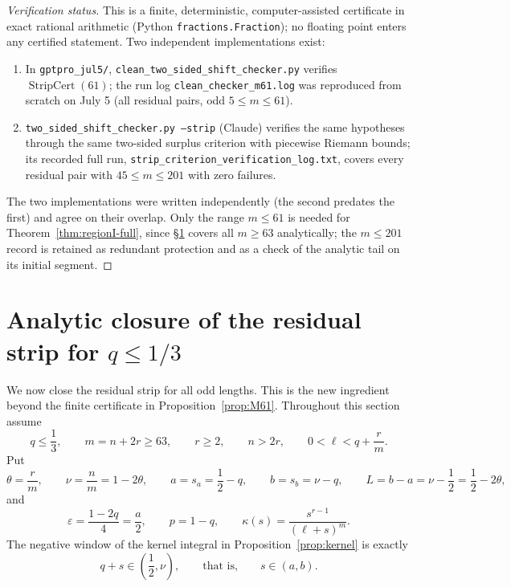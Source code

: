 \documentclass[11pt]{article}
\begin{document}
\begin{proof}[Verification status]
This is a finite, deterministic, computer-assisted certificate in exact
rational arithmetic (Python \texttt{fractions.Fraction}); no floating point
enters any certified statement.  Two independent implementations exist:
\begin{enumerate}[label=\textup{(\alph*)}]
\item In \texttt{gptpro\_jul5/}, \texttt{clean\_two\_sided\_shift\_checker.py} verifies
$\operatorname{StripCert}(61)$; the run log
\texttt{clean\_checker\_m61.log} was reproduced from scratch on July 5
(all residual pairs, odd $5\le m\le61$).
\item \texttt{two\_sided\_shift\_checker.py --strip} (Claude) verifies the
same hypotheses through the same two-sided surplus criterion with piecewise
Riemann bounds; its recorded full run,
\texttt{strip\_criterion\_verification\_log.txt}, covers every residual pair
with $45\le m\le201$ with zero failures.
\end{enumerate}
The two implementations were written independently (the second predates the
first) and agree on their overlap.  Only the range $m\le61$ is needed for
Theorem~\ref{thm:regionI-full}, since \S\ref{sec:analytic-strip} covers all
$m\ge63$ analytically; the $m\le201$ record is retained as redundant
protection and as a check of the analytic tail on its initial segment.
\end{proof}



\section{Analytic closure of the residual strip for $q\le 1/3$}\label{sec:analytic-strip}

We now close the residual strip for all odd lengths.  This is the new ingredient beyond the finite certificate in Proposition~\ref{prop:M61}.  Throughout this section assume
\begin{equation}\label{eq:residual-tail}
        q\le\frac13,\qquad m=n+2r\ge63,\qquad r\ge2,\qquad n>2r,
        \qquad 0<\ell<q+\frac rm.
\end{equation}
Put
\[
        \theta=\frac rm,
        \qquad \nu=\frac nm=1-2\theta,
        \qquad a=s_a=\frac12-q,
        \qquad b=s_b=\nu-q,
        \qquad L=b-a=\nu-\frac12=\frac12-2\theta,
\]
and
\[
        \varepsilon=\frac{1-2q}{4}=\frac a2,
        \qquad p=1-q,
        \qquad \kappa(s)=\frac{s^{r-1}}{(\ell+s)^m}.
\]
The negative window of the kernel integral in Proposition~\ref{prop:kernel} is exactly
\[
        q+s\in\left(\frac12,\nu\right),
        \qquad\text{that is,}\qquad s\in(a,b).
\]
\end{document}
